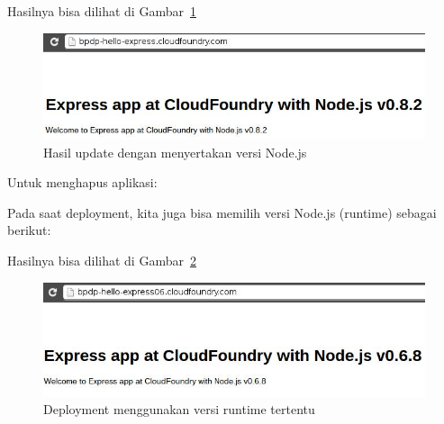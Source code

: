 \lstset{language=bash,caption=Mengupdate aplikasi di server}


Hasilnya bisa dilihat di Gambar~\ref{fig:bab-01-hello-update}

  \begin{figure}
    \begin{center}
      \includegraphics[scale=0.5]{images/bpdp-hello-express-update.jpg}
    \end{center}
    \caption{Hasil update dengan menyertakan versi Node.js}
    \label{fig:bab-01-hello-update}
  \end{figure}

Untuk menghapus aplikasi:

\lstset{language=bash,caption=Menghapus aplikasi yang di-deploy di CF}


Pada saat deployment, kita juga bisa memilih versi Node.js (runtime) sebagai berikut:

\lstset{language=bash,caption=Deployment ke CF dengan memilih runtime Node.js}



Hasilnya bisa dilihat di Gambar~\ref{fig:bab-01-hello-ganti-runtime}

  \begin{figure}
    \begin{center}
      \includegraphics[scale=0.5]{images/bpdp-express-hello-update06.jpg}
    \end{center}
    \caption{Deployment menggunakan versi runtime tertentu}
    \label{fig:bab-01-hello-ganti-runtime}
  \end{figure}

